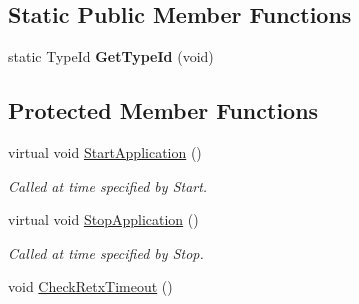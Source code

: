 \subsection*{Static Public Member Functions}
\begin{DoxyCompactItemize}
\item 
static Type\+Id {\bfseries Get\+Type\+Id} (void)\hypertarget{classns3_1_1ndn_1_1Aggregator_a94222e703ca1551519604a987bcfc046}{}\label{classns3_1_1ndn_1_1Aggregator_a94222e703ca1551519604a987bcfc046}

\end{DoxyCompactItemize}
\subsection*{Protected Member Functions}
\begin{DoxyCompactItemize}
\item 
virtual void \hyperlink{classns3_1_1ndn_1_1Aggregator_a938d6e0b6e8b725b167e2a82d5a1a751}{Start\+Application} ()\hypertarget{classns3_1_1ndn_1_1Aggregator_a938d6e0b6e8b725b167e2a82d5a1a751}{}\label{classns3_1_1ndn_1_1Aggregator_a938d6e0b6e8b725b167e2a82d5a1a751}

\begin{DoxyCompactList}\small\item\em Called at time specified by Start. \end{DoxyCompactList}\item 
virtual void \hyperlink{classns3_1_1ndn_1_1Aggregator_af91381e96cde6ad48cad75794e1b9734}{Stop\+Application} ()\hypertarget{classns3_1_1ndn_1_1Aggregator_af91381e96cde6ad48cad75794e1b9734}{}\label{classns3_1_1ndn_1_1Aggregator_af91381e96cde6ad48cad75794e1b9734}

\begin{DoxyCompactList}\small\item\em Called at time specified by Stop. \end{DoxyCompactList}\item 
void \hyperlink{classns3_1_1ndn_1_1Aggregator_aa9417b981e9ad1708339d172093e14ab}{Check\+Retx\+Timeout} ()\hypertarget{classns3_1_1ndn_1_1Aggregator_aa9417b981e9ad1708339d172093e14ab}{}\label{classns3_1_1ndn_1_1Aggregator_aa9417b981e9ad1708339d172093e14ab}


\end{DoxyCompactItemize}
